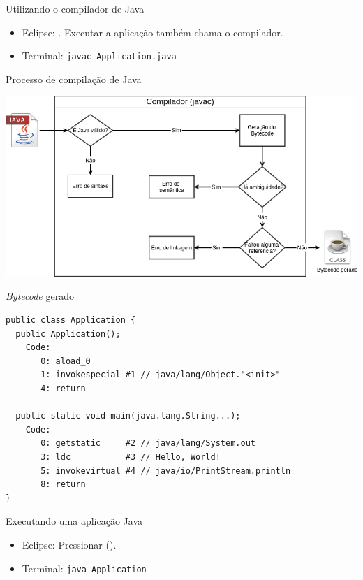 \documentclass{beamer}
\newcommand{\icon}[1]{\raisebox{-.2\height}{\texttt{[image: \#1]}}}
\begin{document}
\begin{frame}{Utilizando o compilador de Java}
    \begin{itemize}
        \item[] \icon{eclipse} Eclipse: .
            Executar a aplicação também chama o compilador.
        \item[] \icon{terminal} Terminal: \texttt{javac Application.java}
    \end{itemize}
\end{frame}


\begin{frame}{Processo de compilação de Java}
    \begin{center}
        \includegraphics[keepaspectratio,width=1\textwidth,height=1\textheight]{compilation_scheme}
    \end{center}
\end{frame}


\begin{frame}[fragile]{\textit{Bytecode} gerado}
    \begin{verbatim}
public class Application {
  public Application();
    Code:
       0: aload_0
       1: invokespecial #1 // java/lang/Object."<init>"
       4: return

  public static void main(java.lang.String...);
    Code:
       0: getstatic     #2 // java/lang/System.out
       3: ldc           #3 // Hello, World!
       5: invokevirtual #4 // java/io/PrintStream.println
       8: return
}
    \end{verbatim}
\end{frame}


\begin{frame}{Executando uma aplicação Java}
    \begin{itemize}
        \item[] \icon{eclipse} Eclipse: Pressionar 
            (\menu{\icon{eclipse_run} Run}).

        \item[] \icon{terminal} Terminal: \texttt{java Application}
    \end{itemize}
\end{frame}
\end{document}
